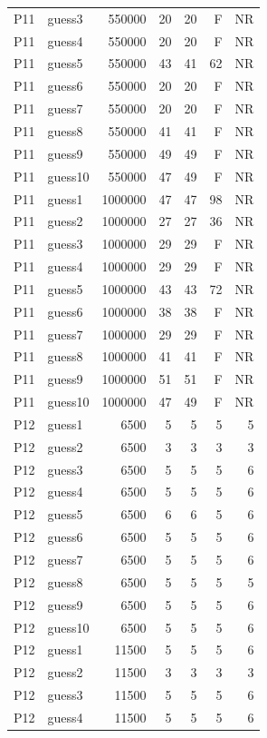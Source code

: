 {\begin{longtable}{llrrrrr}
P11 & guess3 & 550000 & 20 & 20 & F & NR \\
P11 & guess4 & 550000 & 20 & 20 & F & NR \\
P11 & guess5 & 550000 & 43 & 41 & 62 & NR \\
P11 & guess6 & 550000 & 20 & 20 & F & NR \\
P11 & guess7 & 550000 & 20 & 20 & F & NR \\
P11 & guess8 & 550000 & 41 & 41 & F & NR \\
P11 & guess9 & 550000 & 49 & 49 & F & NR \\
P11 & guess10 & 550000 & 47 & 49 & F & NR \\
P11 & guess1 & 1000000 & 47 & 47 & 98 & NR \\
P11 & guess2 & 1000000 & 27 & 27 & 36 & NR \\
P11 & guess3 & 1000000 & 29 & 29 & F & NR \\
P11 & guess4 & 1000000 & 29 & 29 & F & NR \\
P11 & guess5 & 1000000 & 43 & 43 & 72 & NR \\
P11 & guess6 & 1000000 & 38 & 38 & F & NR \\
P11 & guess7 & 1000000 & 29 & 29 & F & NR \\
P11 & guess8 & 1000000 & 41 & 41 & F & NR \\
P11 & guess9 & 1000000 & 51 & 51 & F & NR \\
P11 & guess10 & 1000000 & 47 & 49 & F & NR \\
P12 & guess1 & 6500 & 5 & 5 & 5 & 5 \\
P12 & guess2 & 6500 & 3 & 3 & 3 & 3 \\
P12 & guess3 & 6500 & 5 & 5 & 5 & 6 \\
P12 & guess4 & 6500 & 5 & 5 & 5 & 6 \\
P12 & guess5 & 6500 & 6 & 6 & 5 & 6 \\
P12 & guess6 & 6500 & 5 & 5 & 5 & 6 \\
P12 & guess7 & 6500 & 5 & 5 & 5 & 6 \\
P12 & guess8 & 6500 & 5 & 5 & 5 & 5 \\
P12 & guess9 & 6500 & 5 & 5 & 5 & 6 \\
P12 & guess10 & 6500 & 5 & 5 & 5 & 6 \\
P12 & guess1 & 11500 & 5 & 5 & 5 & 6 \\
P12 & guess2 & 11500 & 3 & 3 & 3 & 3 \\
P12 & guess3 & 11500 & 5 & 5 & 5 & 6 \\
P12 & guess4 & 11500 & 5 & 5 & 5 & 6 \\

\end{longtable}}
